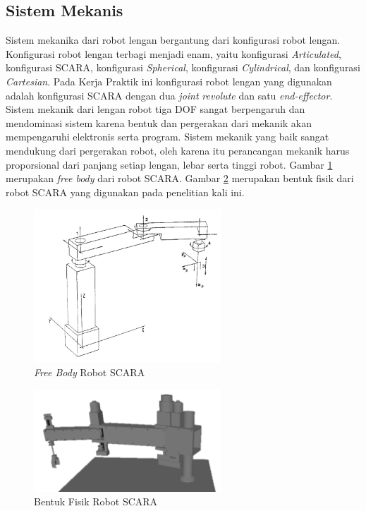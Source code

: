 \subsection{ Sistem Mekanis }
Sistem mekanika dari robot lengan bergantung dari konfigurasi robot lengan. Konfigurasi robot lengan terbagi menjadi enam, yaitu konfigurasi \textit{Articulated}, konfigurasi SCARA, konfigurasi \textit{Spherical}, konfigurasi \textit{Cylindrical}, dan konfigurasi \textit{Cartesian}. Pada Kerja Praktik ini konfigurasi robot lengan yang digunakan adalah konfigurasi SCARA dengan dua \textit{joint} \textit{revolute} dan satu \textit{end-effector}. Sistem mekanik dari lengan robot tiga DOF sangat berpengaruh dan mendominasi sistem karena bentuk dan pergerakan dari mekanik akan mempengaruhi elektronis serta program. Sistem mekanik yang baik sangat mendukung dari pergerakan robot, oleh karena itu perancangan mekanik harus proporsional dari panjang setiap lengan, lebar serta tinggi robot. Gambar \ref{pic.freebodyscara} merupakan \textit{free body} dari robot SCARA. Gambar \ref{pic.fisikscara} merupakan bentuk fisik dari robot SCARA yang digunakan pada penelitian kali ini.
\begin{figure}[H]
	\centering
	\includegraphics[width=7cm]{gambar/scaraa.png}
	\caption{\textit{Free Body} Robot SCARA}
	\label{pic.freebodyscara}
\end{figure}
\begin{figure}[H]
	\centering
	\includegraphics[width=7cm]{gambar/3dscara.png}
	\caption{Bentuk Fisik Robot SCARA}
	\label{pic.fisikscara}
\end{figure}
